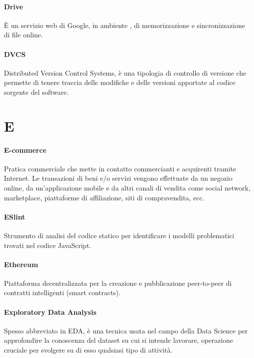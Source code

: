 \documentclass[]{article}
\begin{document}
    \paragraph*{Drive}
    È un servizio web di Google, in ambiente , di memorizzazione e sincronizzazione di file online.

	\paragraph*{DVCS}
	Distributed Version Control Systems, è una tipologia di controllo di versione che permette di tenere traccia delle modifiche e delle versioni apportate al codice sorgente del software.

	\newpage

	\section*{E}

	\paragraph*{E-commerce}
	Pratica commerciale che mette in contatto commercianti e acquirenti tramite Internet. Le transazioni di beni e/o servizi vengono effettuate da un negozio online, da un'applicazione mobile e da altri canali di vendita come social network, marketplace, piattaforme di affiliazione, siti di compravendita, ecc.
	
	\paragraph*{ESlint}
	Strumento di analisi del codice statico per identificare i modelli problematici trovati nel codice JavaScript.

	\paragraph*{Ethereum}
	Piattaforma decentralizzata per la creazione e pubblicazione peer-to-peer di contratti intelligenti (smart contracts).

	\paragraph*{Exploratory Data Analysis}
	Spesso abbreviato in EDA, è una tecnica usata nel campo della Data Science per approfondire la conoscenza del dataset su cui si intende lavorare, operazione cruciale per svolgere su di esso qualsiasi tipo di attività.
\end{document}
